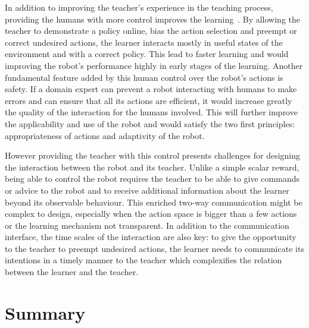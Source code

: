 In addition to improving the teacher's experience in the teaching process, providing the humans with more control improves the learning~\citep{thomaz2008teachable,chernova2009interactive}. By allowing the teacher to demonstrate a policy online, bias the action selection and preempt or correct undesired actions, the learner interacts mostly in useful states of the environment and with a correct policy. This lead to faster learning and would improving the robot's performance highly in early stages of the learning. Another fundamental feature added by this human control over the robot's actions is safety. If a domain expert can prevent a robot interacting with humans to make errors and can ensure that all its actions are efficient, it would increase greatly the quality of the interaction for the humans involved. This will further improve the applicability and use of the robot and would satisfy the two first principles: appropriateness of actions and adaptivity of the robot.

However providing the teacher with this control presents challenges for designing the interaction between the robot and its teacher. Unlike a simple scalar reward, being able to control the robot requires the teacher to be able to give commands or advice to the robot and to receive additional information about the learner beyond its observable behaviour. This enriched two-way communication might be complex to design, especially when the action space is bigger than a few actions or the learning mechanism not transparent. In addition to the communication interface, the time scales of the interaction are also key: to give the opportunity to the teacher to preempt undesired actions, the learner needs to communicate its intentions in a timely manner to the teacher which complexifies the relation between the learner and the teacher. %




\section{Summary}

